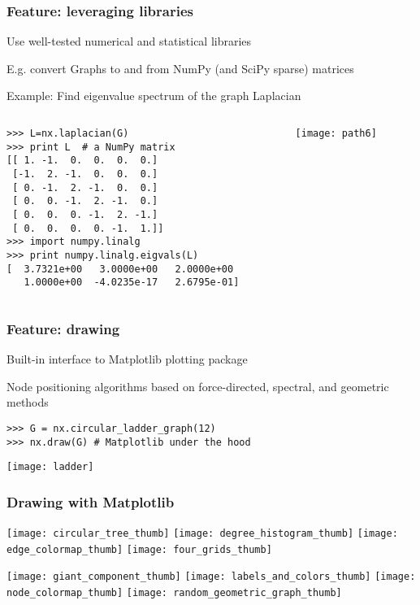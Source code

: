 \documentclass[xcolor=dvipsnames, 9pt]{beamer}
\begin{document}
\begin{frame}[fragile]

\frametitle{Feature: leveraging libraries}

Use well-tested numerical and statistical libraries 

E.g. convert Graphs to and from  NumPy (and SciPy sparse) matrices 

Example: Find eigenvalue spectrum of the graph Laplacian

\begin{columns}[T]
\begin{column}{0.75\textwidth}

\begin{block}{}
\begin{verbatim}
>>> L=nx.laplacian(G)  
>>> print L  # a NumPy matrix
[[ 1. -1.  0.  0.  0.  0.]
 [-1.  2. -1.  0.  0.  0.]
 [ 0. -1.  2. -1.  0.  0.]
 [ 0.  0. -1.  2. -1.  0.]
 [ 0.  0.  0. -1.  2. -1.]
 [ 0.  0.  0.  0. -1.  1.]]
>>> import numpy.linalg
>>> print numpy.linalg.eigvals(L)
[  3.7321e+00   3.0000e+00   2.0000e+00
   1.0000e+00  -4.0235e-17   2.6795e-01]
\end{verbatim}
\end{block}
\end{column}
\begin{column}{0.2\textwidth}
\centerline{\texttt{[image: path6]}}
\end{column}

\end{columns}

\end{frame}

\begin{frame}[fragile]
\frametitle{Feature: drawing}

Built-in interface to Matplotlib plotting package 

Node positioning algorithms based on force-directed, spectral, and geometric methods

\begin{block}{}
\begin{verbatim}
>>> G = nx.circular_ladder_graph(12)
>>> nx.draw(G) # Matplotlib under the hood
\end{verbatim}
\end{block}
\centerline{\texttt{[image: ladder]}}

\end{frame}


\begin{frame}[fragile]
\frametitle{Drawing with Matplotlib}

\texttt{[image: circular\_tree\_thumb]}
\texttt{[image: degree\_histogram\_thumb]}
\texttt{[image: edge\_colormap\_thumb]}
\texttt{[image: four\_grids\_thumb]}

\texttt{[image: giant\_component\_thumb]}
\texttt{[image: labels\_and\_colors\_thumb]}
\texttt{[image: node\_colormap\_thumb]}
\texttt{[image: random\_geometric\_graph\_thumb]}

\end{frame}
\end{document}
